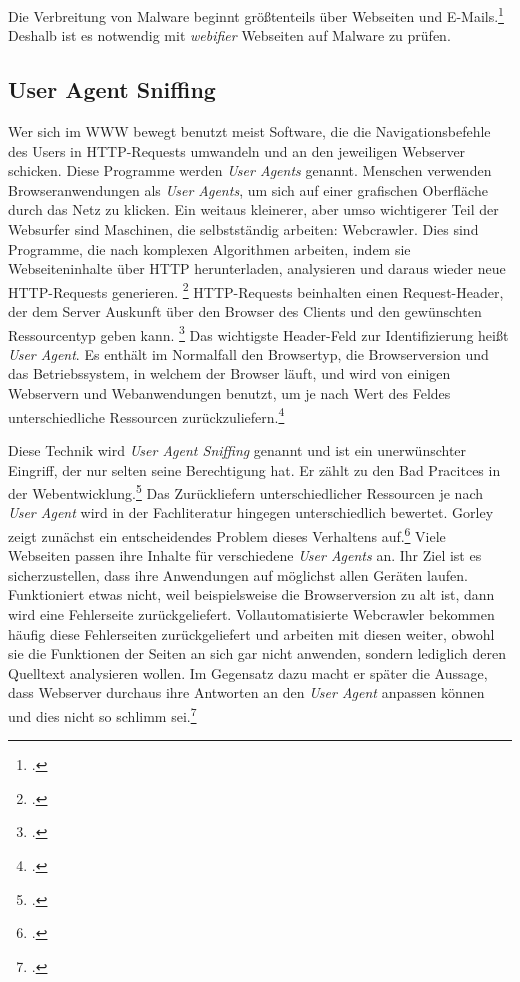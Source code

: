 Die Verbreitung von Malware beginnt größtenteils über Webseiten und
E-Mails.\footcite[Vgl.][97]{netzwerkDatensicherheit} Deshalb ist es notwendig mit \textit{webifier}
Webseiten auf Malware zu prüfen.


\subsection{User Agent Sniffing}
\label{sec:user-agent-sniffing}

Wer sich im \ac{WWW} bewegt benutzt meist Software, die die Navigationsbefehle des Users in
HTTP-Requests umwandeln und an den jeweiligen Webserver schicken.
Diese Programme werden \textit{User Agents} genannt.
Menschen verwenden Browseranwendungen als \textit{User Agents}, um sich auf einer grafischen
Oberfläche durch das Netz zu klicken.
Ein weitaus kleinerer, aber umso wichtigerer Teil der Websurfer sind Maschinen, die selbstständig
arbeiten: Webcrawler.
Dies sind Programme, die nach komplexen Algorithmen arbeiten, indem sie Webseiteninhalte über HTTP
herunterladen, analysieren und daraus wieder neue HTTP-Requests generieren.
\footcite[Vgl.][19]{httpGuide}
HTTP-Requests beinhalten einen Request-Header, der dem Server Auskunft über den Browser des Clients
und den gewünschten Ressourcentyp geben kann.
\footcite[Vgl.][9]{httpReference}
Das wichtigste Header-Feld zur Identifizierung heißt \textit{User Agent}. Es enthält im Normalfall
den Browsertyp, die Browserversion und das Betriebssystem, in welchem der Browser läuft, und
wird von einigen Webservern und Webanwendungen benutzt, um je nach Wert des Feldes unterschiedliche Ressourcen
zurückzuliefern.\footcite[Vgl.][259, 528\psq]{httpGuide}

Diese Technik wird \textit{User Agent Sniffing} genannt und ist ein unerwünschter Eingriff,
der nur selten seine Berechtigung hat.
Er zählt zu den Bad Pracitces in der Webentwicklung.\footcite[Vgl.][]{mdnBrowserDetection}
Das Zurückliefern unterschiedlicher Ressourcen je nach \textit{User Agent} wird in der
Fachliteratur hingegen unterschiedlich bewertet.
Gorley zeigt zunächst ein entscheidendes Problem dieses
Verhaltens auf.\footcite[Vgl.][228]{httpGuide}
Viele Webseiten passen ihre Inhalte für verschiedene \textit{User Agents} an.
Ihr Ziel ist es sicherzustellen, dass ihre Anwendungen auf möglichst allen Geräten laufen.
Funktioniert etwas nicht, weil beispielsweise die Browserversion zu alt ist, dann wird eine
Fehlerseite zurückgeliefert.
Vollautomatisierte Webcrawler bekommen häufig diese Fehlerseiten zurückgeliefert und arbeiten mit
diesen weiter, obwohl sie die Funktionen der Seiten an sich gar nicht anwenden, sondern lediglich
deren Quelltext analysieren wollen.
Im Gegensatz dazu macht er später die Aussage, dass Webserver durchaus ihre Antworten
an den \textit{User Agent} anpassen können und dies nicht so schlimm
sei.\footcite[Vgl.][402]{httpGuide}

